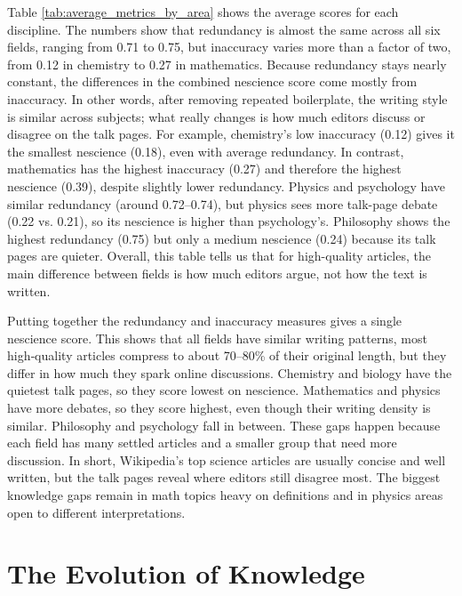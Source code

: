 Table \ref{tab:average_metrics_by_area} shows the average scores for each discipline. The numbers show that redundancy is almost the same across all six fields, ranging from 0.71 to 0.75, but inaccuracy varies more than a factor of two, from 0.12 in chemistry to 0.27 in mathematics. Because redundancy stays nearly constant, the differences in the combined nescience score come mostly from inaccuracy. In other words, after removing repeated boilerplate, the writing style is similar across subjects; what really changes is how much editors discuss or disagree on the talk pages. For example, chemistry’s low inaccuracy (0.12) gives it the smallest nescience (0.18), even with average redundancy. In contrast, mathematics has the highest inaccuracy (0.27) and therefore the highest nescience (0.39), despite slightly lower redundancy. Physics and psychology have similar redundancy (around 0.72–0.74), but physics sees more talk-page debate (0.22 vs. 0.21), so its nescience is higher than psychology’s. Philosophy shows the highest redundancy (0.75) but only a medium nescience (0.24) because its talk pages are quieter. Overall, this table tells us that for high-quality articles, the main difference between fields is how much editors argue, not how the text is written.

Putting together the redundancy and inaccuracy measures gives a single nescience score. This shows that all fields have similar writing patterns, most high‑quality articles compress to about 70–80\% of their original length, but they differ in how much they spark online discussions. Chemistry and biology have the quietest talk pages, so they score lowest on nescience. Mathematics and physics have more debates, so they score highest, even though their writing density is similar. Philosophy and psychology fall in between. These gaps happen because each field has many settled articles and a smaller group that need more discussion. In short, Wikipedia’s top science articles are usually concise and well written, but the talk pages reveal where editors still disagree most. The biggest knowledge gaps remain in math topics heavy on definitions and in physics areas open to different interpretations.

%
%

\section{The Evolution of Knowledge}

